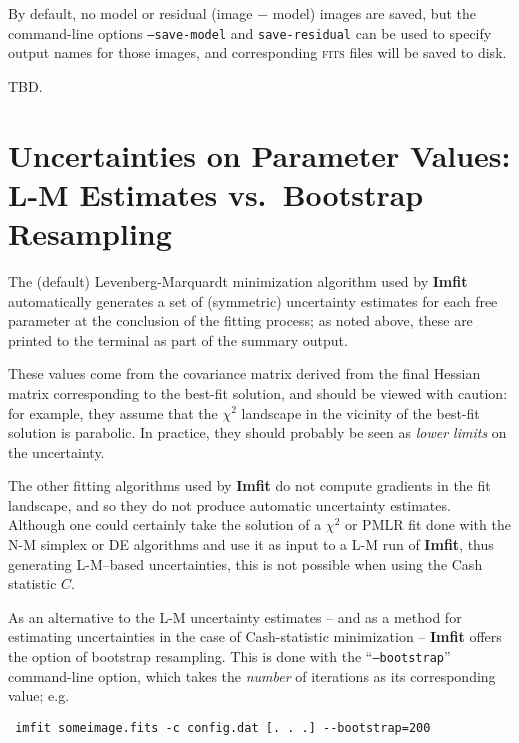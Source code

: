 \documentclass[10pt,a4paper,article]{memoir}
\newcommand{\imfit}{\textbf{Imfit}}
\newcommand{\chisquare}{\ensuremath{\chi^{2}}}
\newcommand{\pmlr}{PMLR}
\begin{document}
By default, no model or residual (image $-$ model) images are saved, but
the command-line options \texttt{--save-model} and
\texttt{save-residual} can be used to specify output names for those
images, and corresponding \textsc{fits} files will be saved to disk.

TBD.

\section{Uncertainties on Parameter Values: L-M Estimates vs.\ Bootstrap Resampling}
\label{sec:bootstrap}

The (default) Levenberg-Marquardt minimization algorithm used by
\imfit{} automatically generates a set of (symmetric) uncertainty
estimates for each free parameter at the conclusion of the fitting
process; as noted above, these are printed to the terminal as part of
the summary output.

These values come from the covariance matrix derived from the final
Hessian matrix corresponding to the best-fit solution, and should be
viewed with caution: for example, they assume that the \chisquare{}
landscape in the vicinity of the best-fit solution is parabolic. In
practice, they should probably be seen as \textit{lower limits} on the
uncertainty.

The other fitting algorithms used by \imfit{} do not compute gradients
in the fit landscape, and so they do not produce automatic uncertainty
estimates. Although one could certainly take the solution of a
\chisquare{} or \pmlr{} fit done with the N-M simplex or DE
algorithms and use it as input to a L-M run of \imfit, thus generating
L-M--based uncertainties, this is not possible when using the Cash statistic $C$.

As an alternative to the L-M uncertainty estimates -- and as a method
for estimating uncertainties in the case of Cash-statistic minimization
-- \imfit{} offers the option of bootstrap resampling. This is done with
the ``\texttt{--bootstrap}'' command-line option, which takes the
\textit{number} of iterations as its corresponding value; e.g.
\begin{verbatim} imfit someimage.fits -c config.dat [. . .] --bootstrap=200 \end{verbatim}
\end{document}
